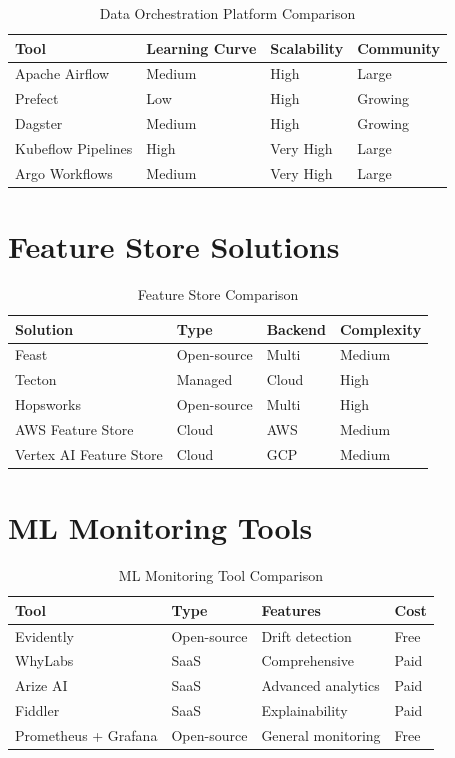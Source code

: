 \begin{table}[h]
\centering
\caption{Data Orchestration Platform Comparison}
\begin{tabular}{@{}llll@{}}
\toprule
\textbf{Tool} & \textbf{Learning Curve} & \textbf{Scalability} & \textbf{Community} \\
\midrule
Apache Airflow & Medium & High & Large \\
Prefect & Low & High & Growing \\
Dagster & Medium & High & Growing \\
Kubeflow Pipelines & High & Very High & Large \\
Argo Workflows & Medium & Very High & Large \\
\bottomrule
\end{tabular}
\end{table}

\section{Feature Store Solutions}

\begin{table}[h]
\centering
\caption{Feature Store Comparison}
\begin{tabular}{@{}llll@{}}
\toprule
\textbf{Solution} & \textbf{Type} & \textbf{Backend} & \textbf{Complexity} \\
\midrule
Feast & Open-source & Multi & Medium \\
Tecton & Managed & Cloud & High \\
Hopsworks & Open-source & Multi & High \\
AWS Feature Store & Cloud & AWS & Medium \\
Vertex AI Feature Store & Cloud & GCP & Medium \\
\bottomrule
\end{tabular}
\end{table}

\section{ML Monitoring Tools}

\begin{table}[h]
\centering
\caption{ML Monitoring Tool Comparison}
\begin{tabular}{@{}llll@{}}
\toprule
\textbf{Tool} & \textbf{Type} & \textbf{Features} & \textbf{Cost} \\
\midrule
Evidently & Open-source & Drift detection & Free \\
WhyLabs & SaaS & Comprehensive & Paid \\
Arize AI & SaaS & Advanced analytics & Paid \\
Fiddler & SaaS & Explainability & Paid \\
Prometheus + Grafana & Open-source & General monitoring & Free \\
\bottomrule
\end{tabular}
\end{table}


